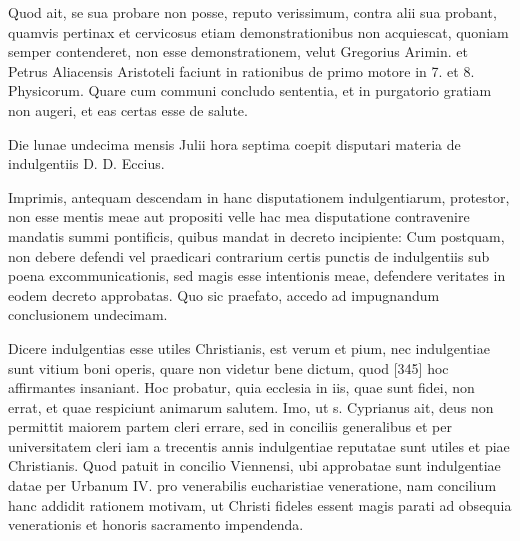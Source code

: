 Quod ait, se sua probare non posse, reputo verissimum, contra alii sua probant, quamvis pertinax et cervicosus etiam demonstrationibus non acquiescat, quoniam semper contenderet, non esse demonstrationem, velut Gregorius Arimin. et Petrus Aliacensis Aristoteli faciunt in rationibus de primo motore in 7. et 8. Physicorum. Quare cum communi concludo sententia, et in purgatorio gratiam non augeri, et eas certas esse de salute.

Die lunae undecima mensis Julii hora septima coepit disputari materia de indulgentiis D. D. Eccius.

Imprimis, antequam descendam in hanc disputationem indulgentiarum, protestor, non esse mentis meae aut propositi velle hac mea disputatione contravenire mandatis summi pontificis, quibus mandat in decreto incipiente: Cum postquam, non debere defendi vel praedicari contrarium certis punctis de indulgentiis sub poena excommunicationis, sed magis esse intentionis meae, defendere veritates in eodem decreto approbatas. Quo sic praefato, accedo ad impugnandum conclusionem undecimam.

Dicere indulgentias esse utiles Christianis, est verum et pium, nec indulgentiae sunt vitium boni operis, quare non videtur bene dictum, quod [345] hoc affirmantes insaniant. Hoc probatur, quia ecclesia in iis, quae sunt fidei, non errat, et quae respiciunt animarum salutem. Imo, ut s. Cyprianus ait, deus non permittit maiorem partem cleri errare, sed in conciliis generalibus et per universitatem cleri iam a trecentis annis indulgentiae reputatae sunt utiles et piae Christianis. Quod patuit in concilio Viennensi, ubi approbatae sunt indulgentiae datae per Urbanum IV. pro venerabilis eucharistiae veneratione, nam concilium hanc addidit rationem motivam, ut Christi fideles essent magis parati ad obsequia venerationis et honoris sacramento impendenda.

